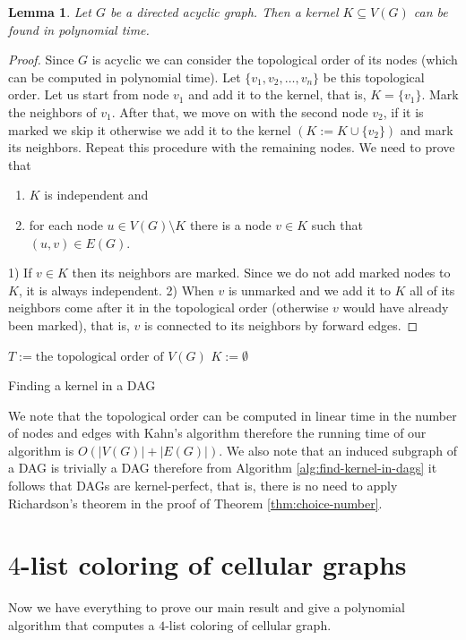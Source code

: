\documentclass[letterpaper, 10 pt, conference]{ieeeconf}  %
\newtheorem{lem}{Lemma}
\begin{document}
\begin{lem}\label{lem:kernel-lemma} Let $G$ be a directed acyclic graph. Then a kernel $K \subseteq V(G)$ can be found in polynomial time.
\end{lem}
\begin{proof} Since $G$ is acyclic we can consider the topological order of its nodes (which can be computed in polynomial time). Let $\lbrace v_1, v_2, \ldots, v_n \rbrace$ be this topological order. Let us start from node $v_1$ and add it to the kernel, that is, $K = \lbrace v_1 \rbrace$. Mark the neighbors of $v_1$. After that, we move on with the second node $v_2$, if it is marked we skip it otherwise we add it to the kernel $(K := K \cup \lbrace v_2 \rbrace)$ and mark its neighbors. Repeat this procedure with the remaining nodes. We need to prove that
\begin{enumerate}
\item $K$ is independent and
\item for each node $u \in V(G) \setminus K$ there is a node $v \in K$ such that $(u,v) \in E(G)$.
\end{enumerate}
1) If $v \in K$ then its neighbors are marked. Since we do not add marked nodes to $K$, it is always independent.
2) When $v$ is unmarked and we add it to $K$ all of its neighbors come after it in the topological order (otherwise $v$ would have already been marked), that is, $v$ is connected to its neighbors by forward edges.
\end{proof}
\begin{algorithm}\label{alg:find-kernel-in-dags}
 $T := \text{the topological order of $V(G)$}$\;
 $K := \emptyset$\;
 \caption{Finding a kernel in a DAG}
\end{algorithm}

We note that the topological order can be computed in linear time in the number of nodes and edges with Kahn's algorithm \cite{Kahn:1962:TSL:368996.369025} therefore the running time of our algorithm is $O(|V(G)|+|E(G)|)$. We also note that an induced subgraph of a DAG is trivially a DAG therefore from Algorithm \ref{alg:find-kernel-in-dags} it follows that DAGs are kernel-perfect, that is, there is no need to apply Richardson's theorem in the proof of Theorem \ref{thm:choice-number}.
\section{$4$-list coloring of cellular graphs}
Now we have everything to prove our main result and give a polynomial algorithm that computes a $4$-list coloring of cellular graph. 
\end{document}
